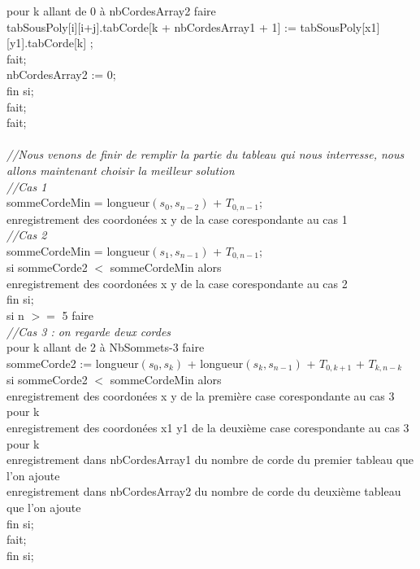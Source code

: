 \documentclass[a4paper,10pt]{article}
\begin{document}
\begin{tabbing}
	  \> \> \> pour k allant de 0 à nbCordesArray2 faire \\
	    \> \> \> \> tabSousPoly[i][i+j].tabCorde[k + nbCordesArray1 + 1] := tabSousPoly[x1][y1].tabCorde[k] ; \\
	  \> \> \> fait;\\
	  \> \> \> nbCordesArray2 := 0;\\
	\> \> fin si; \\
  \> fait; \\
fait; \\
\\
\textit{//Nous venons de finir de remplir la partie du tableau qui nous interresse, nous allons maintenant choisir la meilleur solution} \\ 
\textit{//Cas 1} \\
sommeCordeMin = longueur$(s_0, s_{n-2})$ + $T_{0,n-1}$; \\
enregistrement des coordonées x y de la case corespondante au cas 1 \\
\textit{//Cas 2} \\
sommeCordeMin = longueur$(s_1, s_{n-1})$ + $T_{0,n-1}$; \\
si sommeCorde2 $<$ sommeCordeMin alors \\
  enregistrement des coordonées x y de la case corespondante au cas 2 \\
fin si; \\
si n $>=$ 5 faire \\
  \> \textit{//Cas 3 : on regarde deux cordes} \\
  \> pour k allant de 2 à NbSommets-3 faire \\
    \> \> sommeCorde2 := longueur$(s_0, s_{k})$ + longueur$(s_{k}, s_{n-1})$ + $T_{0,k+1}$ + $T_{k,n-k}$ \\
	  \> \> \> si sommeCorde2 $<$ sommeCordeMin alors \\
	     \> \> \> \>  enregistrement des coordonées x y de la première case corespondante au cas 3 pour k \\
	     \> \> \> \>  enregistrement des coordonées x1 y1 de la deuxième case corespondante au cas 3 pour k \\
	     \> \> \> \> enregistrement dans nbCordesArray1 du nombre de corde du premier tableau que l'on ajoute \\
	     \> \> \> \> enregistrement dans nbCordesArray2 du nombre de corde du deuxième tableau que l'on ajoute \\	      
	  \> \> \> fin si; \\
  \> fait; \\
fin si; \\


\end{tabbing}
\end{document}
